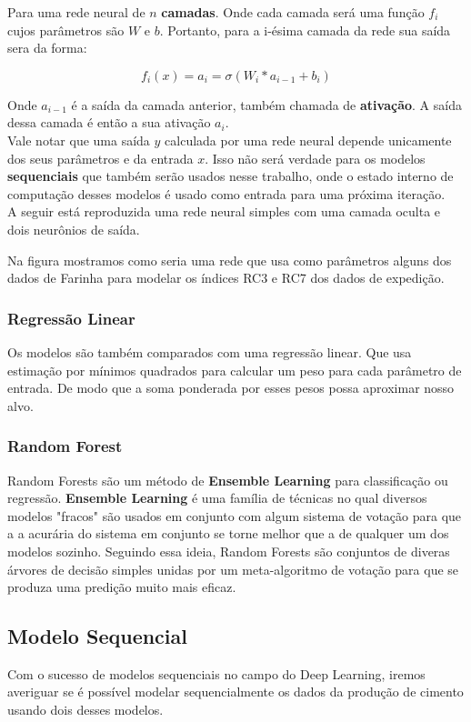 Para uma rede neural de $n$ \textbf{camadas}. Onde cada camada será uma função
$f_i$ cujos parâmetros são $W$ e $b$. Portanto, para a i-ésima camada da rede
sua saída sera da forma: 

\[ f_i (x)=  a_i = \sigma(W_i*a_{i-1} + b_i) \]

Onde $a_{i-1}$ é a saída da camada anterior, também chamada de
\textbf{ativação}. A saída dessa camada é então a sua ativação $a_i$. \\ 

Vale notar que uma saída $y$ calculada por uma rede neural depende unicamente dos
seus parâmetros e da entrada $x$. Isso não será verdade para os modelos
\textbf{sequenciais} que também serão usados nesse trabalho, onde o estado
interno de computação desses modelos é usado como entrada para uma próxima
iteração. \\

A seguir está reproduzida uma rede neural simples com uma camada oculta e dois neurônios de saída.


%


Na figura mostramos como seria uma rede que usa como parâmetros alguns dos dados de Farinha para modelar os índices RC3 e RC7 dos dados de expedição.

\bigskip
\subsubsection{Regressão Linear}
Os modelos são também comparados com uma regressão linear. Que usa estimação por mínimos quadrados para calcular um peso para cada parâmetro de entrada. De modo que a soma ponderada por esses pesos possa aproximar nosso alvo.


\subsubsection{Random Forest}

Random Forests são um método de \textbf{Ensemble Learning} para classificação ou regressão. \textbf{Ensemble Learning} é uma família de técnicas no qual diversos modelos "fracos" são usados em conjunto com algum sistema de votação para que a a acurária do sistema em conjunto se torne melhor que a de qualquer um dos modelos sozinho. Seguindo essa ideia, Random Forests são conjuntos de diveras árvores de decisão simples unidas por um meta-algoritmo de votação para que se produza uma predição muito mais eficaz.


\subsection{Modelo Sequencial}
Com o sucesso de modelos sequenciais no campo do Deep Learning, iremos averiguar se é possível modelar sequencialmente os dados da produção de cimento usando dois desses modelos. 
\\


